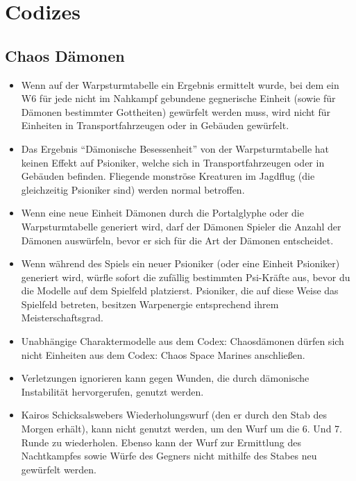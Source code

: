 \section{Codizes}

\subsection{Chaos Dämonen}

\begin{itemize}

 \item Wenn auf der Warpsturmtabelle ein Ergebnis ermittelt wurde, bei dem ein
  W6 für jede nicht im Nahkampf gebundene gegnerische Einheit (sowie für Dämonen
  bestimmter Gottheiten) gewürfelt werden muss, wird nicht für Einheiten in
  Transportfahrzeugen oder in Gebäuden gewürfelt.

 \item Das Ergebnis ``Dämonische Besessenheit'' von der Warpsturmtabelle hat
  keinen Effekt auf Psioniker, welche sich in Transportfahrzeugen oder in
  Gebäuden befinden. Fliegende monströse Kreaturen im Jagdflug (die gleichzeitig
  Psioniker sind) werden normal betroffen.

 \item Wenn eine neue Einheit Dämonen durch die Portalglyphe oder die
  Warpsturmtabelle generiert wird, darf der Dämonen Spieler die Anzahl der
  Dämonen auswürfeln, bevor er sich für die Art der Dämonen entscheidet. 

 \item Wenn während des Spiels ein neuer Psioniker (oder eine Einheit Psioniker)
  generiert wird, würfle sofort die zufällig bestimmten Psi-Kräfte aus, bevor du
  die Modelle auf dem Spielfeld platzierst. Psioniker, die auf diese Weise das
  Spielfeld betreten, besitzen Warpenergie entsprechend ihrem
  Meisterschaftsgrad.

 \item Unabhängige Charaktermodelle aus dem Codex: Chaosdämonen dürfen sich
  nicht Einheiten aus dem Codex: Chaos Space Marines anschließen.

 \item Verletzungen ignorieren kann gegen Wunden, die durch dämonische
  Instabilität hervorgerufen, genutzt werden.

 \item Kairos Schicksalswebers Wiederholungswurf (den er durch den Stab des
  Morgen erhält), kann nicht genutzt werden, um den Wurf um die 6. Und 7. Runde
  zu wiederholen. Ebenso kann der Wurf zur Ermittlung des Nachtkampfes sowie
  Würfe des Gegners nicht mithilfe des Stabes neu gewürfelt werden.


\end{itemize}
